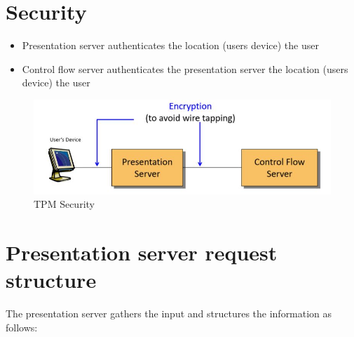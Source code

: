 	\section{Security}
		\begin{itemize}
			\item Presentation server authenticates 
				\subitem the location (users device)
				\subitem the user
			\item Control flow server authenticates
				\subitem the presentation server
				\subitem the location (users device)
				\subitem the user
		\end{itemize}
		\begin{figure}[h!]
			\includegraphics[scale=0.5]{res/tpm_security.jpg}
			\caption{TPM Security}
		\end{figure}
	
		
	\section{Presentation server request structure}
		The presentation server gathers the input and structures the information as follows:
			